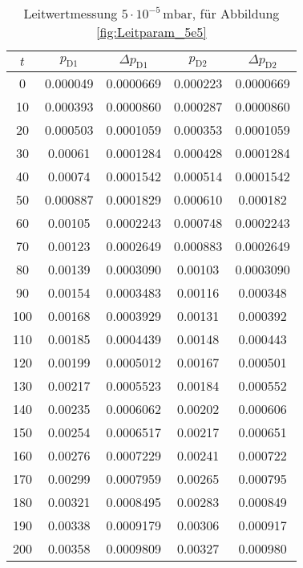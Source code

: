 \begin{table}[H]
    \centering
    \caption{Leitwertmessung $5 \cdot 10^{-5} \, \si{\milli\bar}$, für Abbildung \ref{fig:Leitparam_5e5}}
    \label{tab:Leitparam_5e5}
    \begin{tabular}{c c c c c}
        \toprule
        {$t$} & {$p_\text{D1}$} & {$\Delta p_\text{D1}$} & {$p_\text{D2}$} & {$\Delta p_\text{D2}$} \\
        \midrule
        0  &  0.000049 & 0.0000669 & 0.000223 & 0.0000669\\
        10 &  0.000393 & 0.0000860 & 0.000287 & 0.0000860\\
        20 &  0.000503 & 0.0001059 & 0.000353 & 0.0001059\\
        30 &  0.00061  & 0.0001284 & 0.000428 & 0.0001284\\
        40 &  0.00074  & 0.0001542 & 0.000514 & 0.0001542\\
        50 &  0.000887 & 0.0001829 & 0.000610 & 0.000182\\
        60 &  0.00105  & 0.0002243 & 0.000748 & 0.0002243\\
        70 &  0.00123  & 0.0002649 & 0.000883 & 0.0002649\\
        80 &  0.00139  & 0.0003090 & 0.00103 & 0.0003090\\
        90 &  0.00154  & 0.0003483 & 0.00116 & 0.000348\\
        100 & 0.00168  & 0.0003929 & 0.00131 & 0.000392\\
        110 & 0.00185  & 0.0004439 & 0.00148 & 0.000443\\
        120 & 0.00199  & 0.0005012 & 0.00167 & 0.000501\\
        130 & 0.00217  & 0.0005523 & 0.00184 & 0.000552\\
        140 & 0.00235  & 0.0006062 & 0.00202 & 0.000606\\
        150 & 0.00254  & 0.0006517 & 0.00217 & 0.000651\\
        160 & 0.00276  & 0.0007229 & 0.00241 & 0.000722\\
        170 & 0.00299  & 0.0007959 & 0.00265 & 0.000795\\
        180 & 0.00321  & 0.0008495 & 0.00283 & 0.000849\\
        190 & 0.00338  & 0.0009179 & 0.00306 & 0.000917\\
        200 & 0.00358  & 0.0009809 & 0.00327 & 0.000980\\
        \bottomrule
    \end{tabular}
\end{table}